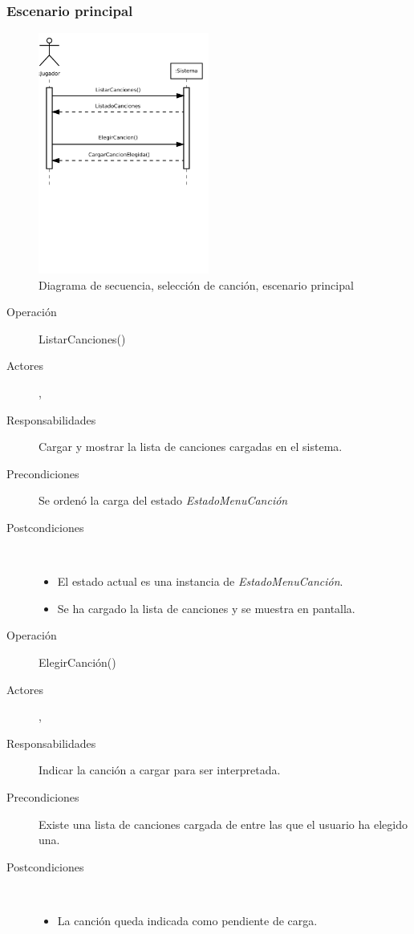 \subsubsection{Escenario principal}
\begin{figure}[h!]
  \centering
  \includegraphics[trim=0cm 10cm 0cm 0cm, clip=true, width=0.5\textwidth]{4_analisis/diagsec_caso2_esc1}
  \caption{Diagrama de secuencia, selección de canción, escenario principal}
\end{figure}

\begin{description}
\item[Operación] ListarCanciones()
\item[Actores] \jugador, \sistema
\item[Responsabilidades] Cargar y mostrar la lista de canciones cargadas en el
  sistema.
\item[Precondiciones] Se ordenó la carga del estado \textit{EstadoMenuCanción}
\item[Postcondiciones] $\quad$
  \begin{itemize}
  \item El estado actual es una instancia de \textit{EstadoMenuCanción}.
  \item Se ha cargado la lista de canciones y se muestra en pantalla.
  \end{itemize}
\end{description}

\begin{description}
\item[Operación] ElegirCanción()
\item[Actores] \jugador, \sistema
\item[Responsabilidades] Indicar la canción a cargar para ser interpretada.
\item[Precondiciones] Existe una lista de canciones cargada de entre las que el
  usuario ha elegido una.
\item[Postcondiciones] $\quad$
  \begin{itemize}
  \item La canción queda indicada como pendiente de carga.
  \end{itemize}
\end{description}


